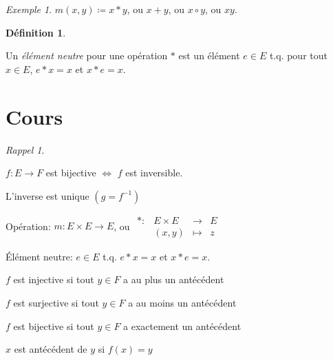 \documentclass{report}
\newcounter{cours}
\newcommand*{\cours}{\section*{Cours \thecours}\stepcounter{cours}}
\theoremstyle{definition}
\newtheorem*{defin}{D\'efinition}
\theoremstyle{remark}
\newtheorem*{exem}{Exemple}
\newtheorem*{rappel}{Rappel}
\begin{document}
	\begin{exem}
		$m(x,y) \coloneq x*y$, ou $x+y$, ou $x \circ y$, ou $xy$.
	\end{exem}

	\begin{defin}~

		Un \emph{\'el\'ement neutre} pour une op\'eration $*$ est un \'el\'ement $e \in E$ t.q. pour tout $x \in E$, $e*x=x$ et $x*e=x$.
	\end{defin}

	\cours
	\begin{rappel}
		~

		\begin{ulist}[noitemsep]
			\item $f:E \to F$ est bijective $\Leftrightarrow$ $f$ est inversible.
			\item L'inverse est unique $(g=f^{-1})$
			\item Op\'eration: $m:E \times E \to E$, ou
			$\begin{array}{rrcl}
				*:&E \times E&\to&E\\
				&(x,y)&\mapsto&z
			\end{array}$
			\item \'El\'ement neutre: $e \in E$ t.q. $e*x=x$ et $x*e=x$.
			\item $f$ est injective si tout $y \in F$ a au plus un ant\'ec\'edent
			\item $f$ est surjective si tout $y \in F$ a au moins un ant\'ec\'edent
			\item $f$ est bijective si tout $y \in F$ a exactement un ant\'ec\'edent
			\item $x$ est ant\'ec\'edent de $y$ si $f(x)=y$
		\end{ulist}
	\end{rappel}
\end{document}
